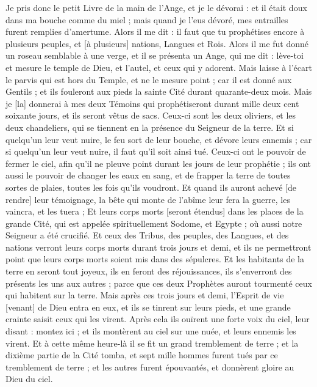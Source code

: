 \begin{multicols}{2}
Je pris donc le petit Livre de la main de l'Ange, et je le dévorai : et il était doux dans ma bouche comme du miel ; mais quand je l'eus dévoré, mes entrailles furent remplies d'amertume.
Alors il me dit : il faut que tu prophétises encore à plusieurs peuples, et [à plusieurs] nations, Langues et Rois.
\VerseOne{}Alors il me fut donné un roseau semblable à une verge, et il se présenta un Ange, qui me dit : lève-toi et mesure le temple de Dieu, et l'autel, et ceux qui y adorent.
Mais laisse à l'écart le parvis qui est hors du Temple, et ne le mesure point ; car il est donné aux Gentils ; et ils fouleront aux pieds la sainte Cité durant quarante-deux mois.
Mais je [la] donnerai à mes deux Témoins qui prophétiseront durant mille deux cent soixante jours, et ils seront vêtus de sacs.
Ceux-ci sont les deux oliviers, et les deux chandeliers, qui se tiennent en la présence du Seigneur de la terre.
Et si quelqu'un leur veut nuire, le feu sort de leur bouche, et dévore leurs ennemis ; car si quelqu'un leur veut nuire, il faut qu'il soit ainsi tué.
Ceux-ci ont le pouvoir de fermer le ciel, afin qu'il ne pleuve point durant les jours de leur prophétie ; ils ont aussi le pouvoir de changer les eaux en sang, et de frapper la terre de toutes sortes de plaies, toutes les fois qu'ils voudront.
Et quand ils auront achevé [de rendre] leur témoignage, la bête qui monte de l'abîme leur fera la guerre, les vaincra, et les tuera ;
Et leurs corps morts [seront étendus] dans les places de la grande Cité, qui est appelée spirituellement Sodome, et Egypte ; où aussi notre Seigneur a été crucifié.
Et ceux des Tribus, des peuples, des Langues, et des nations verront leurs corps morts durant trois jours et demi, et ils ne permettront point que leurs corps morts soient mis dans des sépulcres.
Et les habitants de la terre en seront tout joyeux, ils en feront des réjouissances, ils s'enverront des présents les uns aux autres ; parce que ces deux Prophètes auront tourmenté ceux qui habitent sur la terre.
Mais après ces trois jours et demi, l'Esprit de vie [venant] de Dieu entra en eux, et ils se tinrent sur leurs pieds, et une grande crainte saisit ceux qui les virent.
Après cela ils ouïrent une forte voix du ciel, leur disant : montez ici ; et ils montèrent au ciel sur une nuée, et leurs ennemis les virent.
Et à cette même heure-là il se fit un grand tremblement de terre ; et la dixième partie de la Cité tomba, et sept mille hommes furent tués par ce tremblement de terre ; et les autres furent épouvantés, et donnèrent gloire au Dieu du ciel.

\end{multicols}
